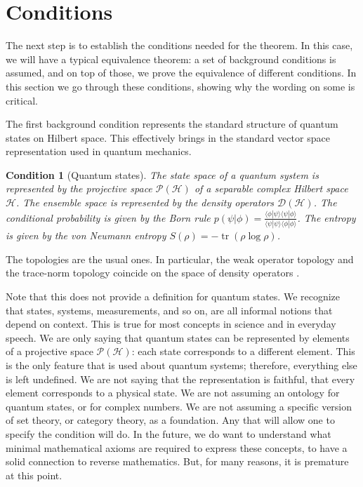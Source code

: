 \documentclass[entropy,article,submit,moreauthors]{Definitions/mdpi}
\newtheorem{condth}{Condition}
\renewcommand*{\thecondth}{\Roman{condth}}
\newenvironment{condition}[2][]{\renewcommand{\thecondth}{#2}\begin{condth}[#1]\label{#2}}{\end{condth}\renewcommand{\thecondth}{\Roman{condth}}}
\def\>{\rangle}
\def\<{\langle}
\DeclareMathOperator{\tr}{tr}
\begin{document}
\section{Conditions}

The next step is to establish the conditions needed for the theorem. In this case, we will have a typical equivalence theorem: a set of background conditions is assumed, and on top of those, we prove the equivalence of different conditions. In this section we go through these conditions, showing why the wording on some is critical.

The first background condition represents the standard structure of quantum states on Hilbert space. This effectively brings in the standard vector space representation used in quantum mechanics.
\begin{condition}[Quantum states]{QST:H}
	The state space of a quantum system is represented by the projective space $\mathcal{P}(\mathcal{H})$ of a separable complex Hilbert space $\mathcal{H}$. The ensemble space is represented by the density operators $\mathcal{D}(\mathcal{H})$. The conditional probability is given by the Born rule $p(\psi|\phi) = \frac{\< \phi | \psi \>\< \psi | \phi \>}{\< \psi | \psi \>\< \phi | \phi \>}$. The entropy is given by the von Neumann entropy $S(\rho) = -\tr(\rho \log \rho)$.
\end{condition}
The topologies are the usual ones. In particular, the weak operator topology and the trace-norm topology coincide on the space of density operators \cite[Lemma~11.1]{Holevo2019}.

Note that this does not provide a definition for quantum states. We recognize that states, systems, measurements, and so on, are all informal notions that depend on context. This is true for most concepts in science and in everyday speech. We are only saying that quantum states can be represented by elements of a projective space $\mathcal{P}(\mathcal{H})$: each state corresponds to a different element. This is the only feature that is used about quantum systems; therefore, everything else is left undefined. We are not saying that the representation is faithful, that every element corresponds to a physical state. We are not assuming an ontology for quantum states, or for complex numbers. We are not assuming a specific version of set theory, or category theory, as a foundation. Any that will allow one to specify the condition will do. In the future, we do want to understand what minimal mathematical axioms are required to express these concepts, to have a solid connection to reverse mathematics. But, for many reasons, it is premature at this point.
\end{document}
